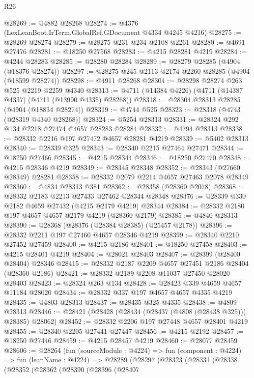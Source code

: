 \begin{lexlean}{R26}
\begin{coremodule}
@28269 := @4882 @28268
@28274 := @4376 (LexLeanBoot.IrTerm.GlobalRef.GDocument @4334 @4245 @4216)
@28275 := @28269 @28274
@28279 := @28275 @231 @234 @2108 @2261
@28280 := @4691 @27476
@28281 := @18250 @27568
@28283 := @4215 @28281 @4219
@28284 := @4244 @28283
@28285 := @28280 @28284
@28289 := @28279 @28285 (@4904 (@18376 @28274))
@28297 := @28275 @245 @2113 @2174 @2260 @28285 (@4904 (@18599 @28274))
@28298 := @4911 @28268
@28304 := @28298 @28274 @263 @525 @2219 @2259 @4340
@28313 := @4711 (@14384 @4226) (@4711 (@14387 @4337) (@4711 (@13990 @4335) @28268))
@28318 := @28304 @28313 @28285 (@4904 (@18834 @28274))
@28319 := @4744 @525
@28323 := @28318 (@4743 (@28319 @4340 @28268))
@28324 := @5254 @28313
@28331 := @28324 @292 @134 @2218 @27474 @4657 @28283 @28284
@28332 := @4794 @28313
@28338 := @28332 @2216 @197 @27472 @4657 @28281 @4219
@28339 := @5402 @28313
@28340 := @28339 @325
@28343 := @28340 @2215 @27464 @27471
@28344 := @18250 @27466
@28345 := @4215 @28344
@28346 := @18250 @27470
@28348 := @4215 @28346 @4219
@28349 := @28345 @28348
@28352 := @28343 (@27660 @28349) @28281
@28358 := @28332 @2079 @2214 @4657 @27463 @2078 @28349
@28360 := @4834 @28313 @381
@28362 := @28358 (@28360 @2078)
@28368 := @28332 @2183 @2213 @27433 @27462 @28344 @28348
@28376 := @28339 @330 @2182 @4659 @27432 (@4215 @2179 @4219) @28344
@28384 := @28332 @2180 @197 @4657 @4657 @2179 @4219 (@28360 @2179)
@28385 := @4840 @28313
@28390 := @28368 (@28376 (@28384 @28385) (@25457 @2178))
@28396 := @28332 @2211 @197 @27460 @4657 @28346 @4219
@28399 := @28340 @2210 @27452 @27459
@28400 := @4215 @2186
@28401 := @18250 @27458
@28403 := @4215 @28401 @4219
@28404 := @28021 @28403
@28407 := @28399 (@28400 @28404) @28346
@28415 := @28332 @2187 @2209 @4657 @27451 @2186 @28404 (@28360 @2186)
@28421 := @28332 @2189 @2208 @11037 @27450 @28020 @28403
@28423 := @28324 @263 @134
@28428 := @28423 @339 @4659 @4657 @11184 @28020
@28434 := @28332 @337 @197 @4657 @4657 @4335 @4219
@28435 := @4803 @28313
@28437 := @28435 @325 @4335
@28438 := @4809 @28313
@28446 := @28421 (@28428 (@28434 (@28437 (@4808 (@28438 @325))) @28385) @28062)
@28452 := @28332 @2206 @197 @27448 @4657 @28401 @4219
@28455 := @28340 @2205 @27441 @27447
@28456 := @4215 @2192
@28457 := @18250 @27446
@28459 := @4215 @28457 @4219
@28460 := @28077 @28459
@28606 := @28264
    (fun (sourceModule : @4224) =>
    fun (component : @4224) =>
    fun (leanName : @4224) =>
    @28289
      (@28297
        (@28323
          (@28331
            (@28338
              (@28352
                (@28362
                  (@28390
                    (@28396
                      (@28407

\end{coremodule}
\end{lexlean}
